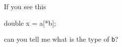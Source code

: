 If you see this

\begin{consolethree}[escapeinside=||]

double x = a[*b]; 

\end{consolethree}



can you tell me what is the type of \texttt{b}?

